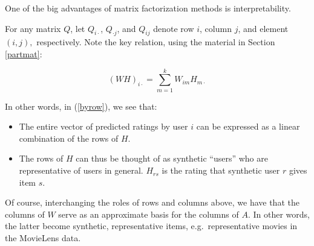 One of the big advantages of matrix factorization methods is
interpretability.

For any matrix $Q$, let $Q_{i \cdot }$, $Q_{\cdot j}$, and $Q_{ij}$
denote row $i$, column $j$, and element $(i,j),$ respectively.  Note the
key relation, using the material in Section \ref{partmat}:

\begin{equation}
\label{byrow}
(WH)_{i \cdot} = \sum_{m=1}^k W_{im} H_{m \cdot}
\end{equation}

In other words, in (\ref{byrow}), we see that:

\begin{itemize}

\item The entire vector of predicted ratings by user $i$ can be
expressed as a linear combination of the rows of $H$.


\item The rows of $H$ can thus be thought of as synthetic
``users'' who are representative of users in general.  $H_{rs}$ is the
rating that synthetic user $r$ gives item $s$.

\end{itemize} 

Of course, interchanging the roles of rows and columns above, we have
that the columns of $W$ serve as an approximate basis for the columns of
$A$.  In other words, the latter become synthetic, representative items,
e.g.\ representative movies in the MovieLens data.

% 
% 

